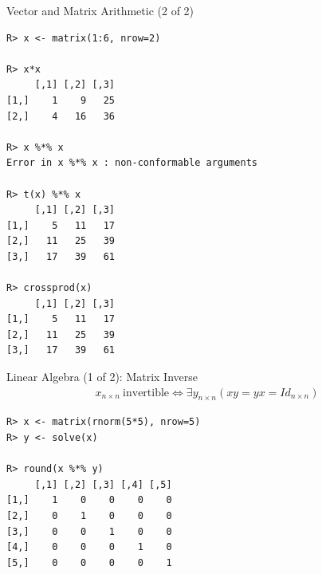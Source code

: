 \begin{frame}
  \begin{exampleblock}{Vector and Matrix Arithmetic (2 of 2)}\pause
  \begin{lstlisting}[backgroundcolor=\color{white},basicstyle=\ttfamily\color{dkgray}\scriptsize,keywordstyle=\color{black}, 
  commentstyle=\color{orange},stringstyle=\color{mauve}]
R> x <- matrix(1:6, nrow=2)

R> x*x
     [,1] [,2] [,3]
[1,]    1    9   25
[2,]    4   16   36

R> x %*% x
Error in x %*% x : non-conformable arguments

R> t(x) %*% x
     [,1] [,2] [,3]
[1,]    5   11   17
[2,]   11   25   39
[3,]   17   39   61

R> crossprod(x)
     [,1] [,2] [,3]
[1,]    5   11   17
[2,]   11   25   39
[3,]   17   39   61
\end{lstlisting}
  \end{exampleblock}
\end{frame}

\begin{frame}[fragile]
  \begin{exampleblock}{Linear Algebra (1 of 2): Matrix Inverse}\pause
  \begin{align*}
    x_{n\times n}\ \text{invertible} \iff \exists y_{n\times n} \left( xy = yx = Id_{n\times n} \right)
  \end{align*}
\begin{lstlisting}[backgroundcolor=\color{white},basicstyle=\ttfamily\color{dkgray}\scriptsize,keywordstyle=\color{black}, 
  commentstyle=\color{orange},stringstyle=\color{mauve}]
R> x <- matrix(rnorm(5*5), nrow=5)
R> y <- solve(x)

R> round(x %*% y)
     [,1] [,2] [,3] [,4] [,5]
[1,]    1    0    0    0    0
[2,]    0    1    0    0    0
[3,]    0    0    1    0    0
[4,]    0    0    0    1    0
[5,]    0    0    0    0    1
\end{lstlisting}
  \end{exampleblock}
\end{frame}



